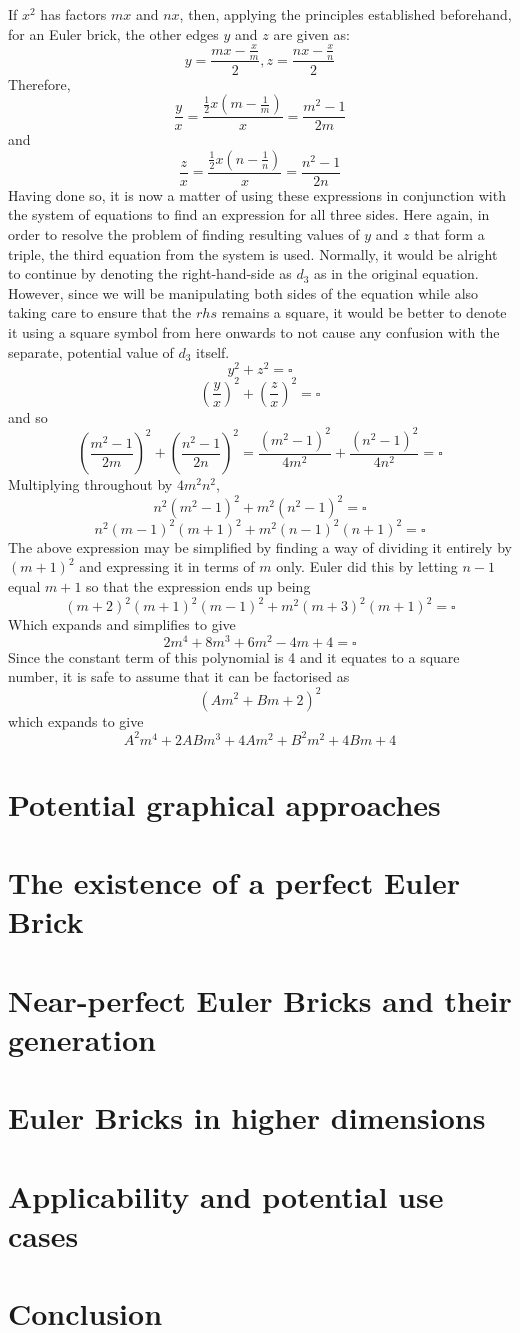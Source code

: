 \documentclass[11pt]{article}
\begin{document}
If $x^2$ has factors $mx$ and $nx$, then, applying the principles established beforehand, for an Euler brick, the other edges $y$ and $z$ are given as:
$$y=\frac{mx-\frac{x}{m}}{2}, z=\frac{nx-\frac{x}{n}}{2}$$
Therefore, 
$$\frac{y}{x}=\frac{\frac{1}{2}x(m-\frac{1}{m})}{x}=\frac{m^2-1}{2m}$$
and 
$$\frac{z}{x}=\frac{\frac{1}{2}x(n-\frac{1}{n})}{x}=\frac{n^2-1}{2n}$$
Having done so, it is now a matter of using these expressions in conjunction with the system of equations to find an expression for all three sides. Here again, in order to resolve the problem of finding resulting values of $y$ and $z$ that form a triple, the third equation from the system is used. Normally, it would be alright to continue by denoting the right-hand-side as $d_3$ as in the original equation. However, since we will be manipulating both sides of the equation while also taking care to ensure that the $rhs$ remains a square, it would be better to denote it using a square symbol from here onwards to not cause any confusion with the separate, potential value of $d_3$ itself.
$$y^2+z^2=\square$$
$$\left(\frac{y}{x}\right)^2+\left(\frac{z}{x}\right)^2=\square$$
and so
$$\left(\frac{m^2-1}{2m}\right)^2+\left(\frac{n^2-1}{2n}\right)^2=\frac{(m^2-1)^2}{4m^2}+\frac{(n^2-1)^2}{4n^2}=\square$$
Multiplying throughout by $4m^2n^2$,
$$n^2(m^2-1)^2+m^2(n^2-1)^2=\square$$
$$n^2(m-1)^2(m+1)^2+m^2(n-1)^2(n+1)^2=\square$$
The above expression may be simplified by finding a way of dividing it entirely by $(m+1)^2$ and expressing it in terms of $m$ only. Euler did this by letting $n-1$ equal $m+1$ so that the expression ends up being
$$(m+2)^2(m+1)^2(m-1)^2+m^2(m+3)^2(m+1)^2=\square$$
Which expands and simplifies to give
$$2m^4+8m^3+6m^2-4m+4=\square$$
Since the constant term of this polynomial is 4 and it equates to a square number, it is safe to assume that it can be factorised as
$$(Am^2+Bm+2)^2$$
which expands to give
$$A^2m^4+2ABm^3+4Am^2+B^2m^2+4Bm+4$$
\section{Potential graphical approaches}
\section{The existence of a perfect Euler Brick}
\section{Near-perfect Euler Bricks and their generation}
\section{Euler Bricks in higher dimensions}
\section{Applicability and potential use cases}
\section{Conclusion}
\newpage

 
\end{document}
